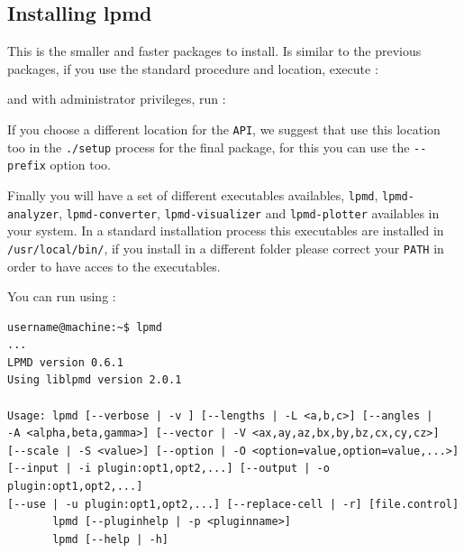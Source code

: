 \subsection{Installing lpmd}

This is the smaller and faster packages to install. Is similar to the previous
packages, if you use the standard procedure and location, execute :


and with administrator privileges, run :


If you choose a different location for the \verb|API|, we suggest that use this
location too in the \verb|./setup| process for the final package, for this you
can use the \verb|--prefix| option too.

Finally you will have a set of different executables availables, \verb|lpmd|,
\verb|lpmd-analyzer|, \verb|lpmd-converter|, \verb|lpmd-visualizer| and
\verb|lpmd-plotter| availables in your system. In a standard installation
process this executables are installed in \verb|/usr/local/bin/|, if you
install {\lpmd} in a different folder please correct your \verb|PATH| in order
to have acces to the executables.

You can run {\lpmd} using :

\begin{verbatim}
username@machine:~$ lpmd
...
LPMD version 0.6.1
Using liblpmd version 2.0.1

Usage: lpmd [--verbose | -v ] [--lengths | -L <a,b,c>] [--angles | 
-A <alpha,beta,gamma>] [--vector | -V <ax,ay,az,bx,by,bz,cx,cy,cz>] 
[--scale | -S <value>] [--option | -O <option=value,option=value,...>] 
[--input | -i plugin:opt1,opt2,...] [--output | -o plugin:opt1,opt2,...] 
[--use | -u plugin:opt1,opt2,...] [--replace-cell | -r] [file.control]
       lpmd [--pluginhelp | -p <pluginname>]
       lpmd [--help | -h]
\end{verbatim}

